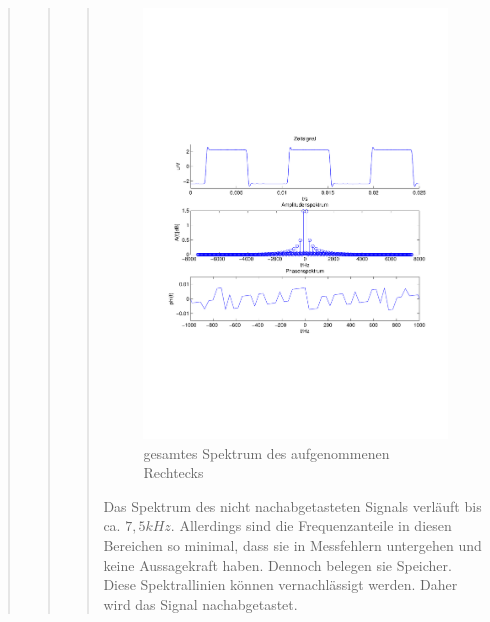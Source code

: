 \begin{quote}
\begin{quote}
\begin{quote}
            \begin{figure}[H]
            \centering
                \includegraphics[scale=0.7, trim = 1.5cm 6.5cm 1cm 7.5cm,
                clip]{./Bilder/rechteck_100Hz_15kHz_keine_frequenzbegrenzung.pdf}
                    \caption{gesamtes Spektrum des aufgenommenen Rechtecks}
            \end{figure}
        
            Das Spektrum des nicht nachabgetasteten Signals verläuft bis ca. $7,5kHz$. Allerdings sind die
            Frequenzanteile in diesen Bereichen so minimal, dass sie in Messfehlern untergehen und keine Aussagekraft haben. Dennoch belegen sie Speicher.\\
            Diese Spektrallinien können vernachlässigt werden. Daher wird das Signal nachabgetastet.
            

\end{quote}
\end{quote}
\end{quote}

